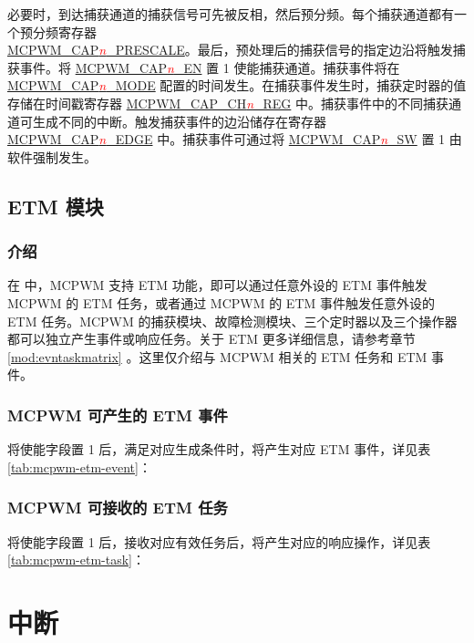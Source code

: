 \documentclass[main\_\_CN.tex]{subfiles}
\begin{document}
必要时，到达捕获通道的捕获信号可先被反相，然后预分频。每个捕获通道都有一个预分频寄存器 \\\hyperref[fielddesc:MCPWMCAPNPRESCALE]{MCPWM\_CAP\textcolor{red}{\it{n}}\_PRESCALE}。最后，预处理后的捕获信号的指定边沿将触发捕获事件。将 \hyperref[fielddesc:MCPWMCAPNEN]{MCPWM\_CAP\textcolor{red}{\it{n}}\_EN} 置 1 使能捕获通道。捕获事件将在 \hyperref[fielddesc:MCPWMCAPNMODE]{MCPWM\_CAP\textcolor{red}{\it{n}}\_MODE} 配置的时间发生。在捕获事件发生时，捕获定时器的值存储在时间戳寄存器 \hyperref[regdesc:MCPWMCAPCHNREG]{MCPWM\_CAP\_CH\textcolor{red}{\it{n}}\_REG} 中。捕获事件中的不同捕获通道可生成不同的中断。触发捕获事件的边沿储存在寄存器 \hyperref[fielddesc:MCPWMCAPNEDGE]{MCPWM\_CAP\textcolor{red}{\it{n}}\_EDGE} 中。捕获事件可通过将 \hyperref[fielddesc:MCPWMCAPNSW]{MCPWM\_CAP\textcolor{red}{\it{n}}\_SW} 置 1 由软件强制发生。

\subsection{ETM 模块}

\subsubsection{介绍}
在 \chipname{} 中，MCPWM 支持 ETM 功能，即可以通过任意外设的 ETM 事件触发 MCPWM 的 ETM 任务，或者通过 MCPWM 的 ETM 事件触发任意外设的 ETM 任务。MCPWM 的捕获模块、故障检测模块、三个定时器以及三个操作器都可以独立产生事件或响应任务。关于 ETM 更多详细信息，请参考章节 \ref{mod:evntaskmatrix} 。这里仅介绍与 MCPWM 相关的 ETM 任务和 ETM 事件。

\subsubsection{MCPWM 可产生的 ETM 事件}
将使能字段置 1 后，满足对应生成条件时，将产生对应 ETM 事件，详见表 \ref{tab:mcpwm-etm-event}：



\subsubsection{MCPWM 可接收的 ETM 任务}
将使能字段置 1 后，接收对应有效任务后，将产生对应的响应操作，详见表 \ref{tab:mcpwm-etm-task}：



\section{中断}
\label{sec:mcpwm-interrupts}
\end{document}
